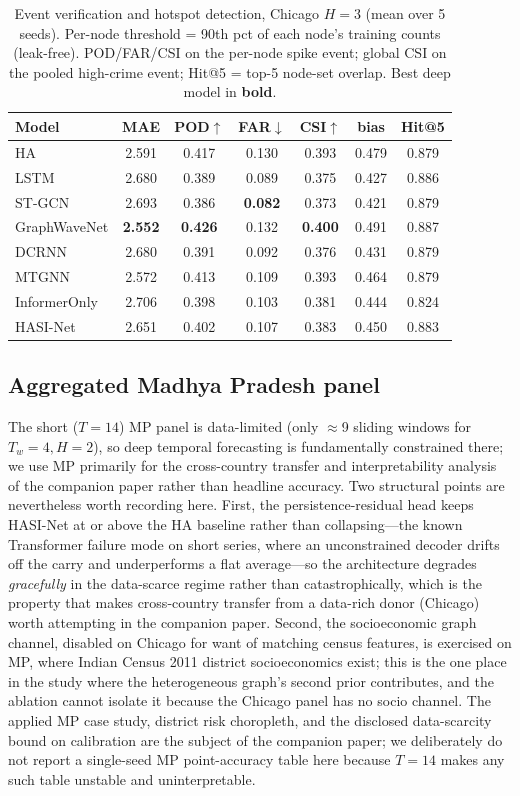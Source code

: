 \documentclass[11pt,conference]{IEEEtran}
\begin{document}
\begin{table}[t]
\centering
\small
\caption{Event verification and hotspot detection, Chicago $H{=}3$ (mean over
5 seeds). Per-node threshold = 90th pct of each node's training counts (leak-free).
POD/FAR/CSI on the per-node spike event; global CSI on the pooled high-crime
event; Hit@5 = top-5 node-set overlap. Best deep model in \textbf{bold}.}
\label{tab:hotspot}
\begin{tabular}{lcccccc}
\toprule
Model & MAE & POD$\uparrow$ & FAR$\downarrow$ & CSI$\uparrow$ & bias & Hit@5\\
\midrule
HA            & 2.591 & 0.417 & 0.130 & 0.393 & 0.479 & 0.879\\
LSTM          & 2.680 & 0.389 & 0.089 & 0.375 & 0.427 & 0.886\\
ST-GCN        & 2.693 & 0.386 & \textbf{0.082} & 0.373 & 0.421 & 0.879\\
GraphWaveNet  & \textbf{2.552} & \textbf{0.426} & 0.132 & \textbf{0.400} & 0.491 & 0.887\\
DCRNN         & 2.680 & 0.391 & 0.092 & 0.376 & 0.431 & 0.879\\
MTGNN         & 2.572 & 0.413 & 0.109 & 0.393 & 0.464 & 0.879\\
InformerOnly  & 2.706 & 0.398 & 0.103 & 0.381 & 0.444 & 0.824\\
HASI-Net      & 2.651 & 0.402 & 0.107 & 0.383 & 0.450 & 0.883\\
\bottomrule
\end{tabular}
\end{table}

\subsection{Aggregated Madhya Pradesh panel}\label{sec:mp}
The short ($T{=}14$) MP panel is data-limited (only $\approx$9 sliding windows
for $T_w{=}4,H{=}2$), so deep temporal forecasting is fundamentally constrained
there; we use MP primarily for the cross-country transfer and interpretability
analysis of the companion paper rather than headline accuracy. Two structural
points are nevertheless worth recording here. First, the
persistence-residual head keeps HASI-Net at or above the HA baseline rather
than collapsing---the known Transformer failure mode on short series, where an
unconstrained decoder drifts off the carry and underperforms a flat average---so
the architecture degrades \emph{gracefully} in the data-scarce regime rather
than catastrophically, which is the property that makes cross-country transfer
from a data-rich donor (Chicago) worth attempting in the companion paper.
Second, the socioeconomic graph channel, disabled on Chicago for want of
matching census features, is exercised on MP, where Indian Census 2011
district socioeconomics exist; this is the one place in the study where the
heterogeneous graph's second prior contributes, and the ablation cannot isolate
it because the Chicago panel has no socio channel. The applied MP case study,
district risk choropleth, and the disclosed data-scarcity bound on calibration
are the subject of the companion paper; we deliberately do not report a
single-seed MP point-accuracy table here because $T{=}14$ makes any such table
unstable and uninterpretable.
\end{document}
